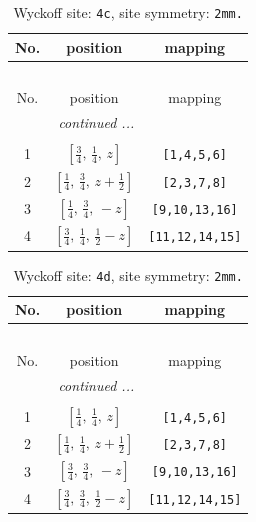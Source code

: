 \documentclass[fleqn,8pt]{jsarticle}
\begin{document}
\renewcommand{\arraystretch}{1.2}
\begin{longtable}{ccc}
\caption{Wyckoff site: {\tt 4c}, site symmetry: {\tt 2mm.}}
 \\
 \hline \hline
No. & position & mapping \\ \hline \endfirsthead

\multicolumn{2}{l}{\tablename\ \thetable{}} \\
 \hline \hline
No. & position & mapping \\ \hline \endhead

 \hline \hline
\multicolumn{2}{r}{\footnotesize\it continued ...} \\ \endfoot

 \hline \hline
\multicolumn{2}{r}{} \\ \endlastfoot

1 & $\left[ \frac{3}{4},\, \frac{1}{4},\, z \right]$ & {\tt [1,4,5,6]} \\ \hline
2 & $\left[ \frac{1}{4},\, \frac{3}{4},\, z + \frac{1}{2} \right]$ & {\tt [2,3,7,8]} \\ \hline
3 & $\left[ \frac{1}{4},\, \frac{3}{4},\, - z \right]$ & {\tt [9,10,13,16]} \\ \hline
4 & $\left[ \frac{3}{4},\, \frac{1}{4},\, \frac{1}{2} - z \right]$ & {\tt [11,12,14,15]} \\
\end{longtable}
\renewcommand{\arraystretch}{1.2}
\begin{longtable}{ccc}
\caption{Wyckoff site: {\tt 4d}, site symmetry: {\tt 2mm.}}
 \\
 \hline \hline
No. & position & mapping \\ \hline \endfirsthead

\multicolumn{2}{l}{\tablename\ \thetable{}} \\
 \hline \hline
No. & position & mapping \\ \hline \endhead

 \hline \hline
\multicolumn{2}{r}{\footnotesize\it continued ...} \\ \endfoot

 \hline \hline
\multicolumn{2}{r}{} \\ \endlastfoot

1 & $\left[ \frac{1}{4},\, \frac{1}{4},\, z \right]$ & {\tt [1,4,5,6]} \\ \hline
2 & $\left[ \frac{1}{4},\, \frac{1}{4},\, z + \frac{1}{2} \right]$ & {\tt [2,3,7,8]} \\ \hline
3 & $\left[ \frac{3}{4},\, \frac{3}{4},\, - z \right]$ & {\tt [9,10,13,16]} \\ \hline
4 & $\left[ \frac{3}{4},\, \frac{3}{4},\, \frac{1}{2} - z \right]$ & {\tt [11,12,14,15]} \\
\end{longtable}
\end{document}
